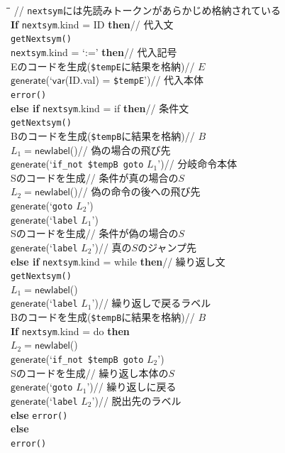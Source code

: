 \documentclass[dvipdfmx]{jarticle}
\begin{document}
\begin{tabbing}
\qquad\=\qquad\=\qquad\qquad\qquad\qquad\qquad\qquad\qquad\qquad\qquad\= \kill
// \verb|nextsym|には先読みトークンがあらかじめ格納されている\\
{\rm\bf If} \verb|nextsym|.kind = {\sf ID} {\rm\bf then}\>\>\>// 代入文\\
\> \verb|getNextsym()|\\
 \verb|nextsym|.kind = `{\sf :=}' {\rm\bf then}\>\>// 代入記号\\
\>\> Eのコードを生成(\verb|$tempE|に結果を格納)\>// $E$\\
\>\> $\mathsf{generate}$(`$\mathsf{var}$({\sf ID}.val) = \verb|$tempE|')\>// 代入本体\\
 \verb|error()|\\
{\rm\bf else if} \verb|nextsym|.kind = {\sf if} {\rm\bf then}\>\>\>// 条件文\\
\> \verb|getNextsym()|\\
\> Bのコードを生成(\verb|$tempB|に結果を格納)\>\>// $B$\\
\> $L_1=\mathsf{newlabel}$()\>\>// 偽の場合の飛び先\\
\> $\mathsf{generate}$(`\verb|if_not|\ \verb|$tempB|\ \verb|goto| $L_1$')\>\>// 分岐命令本体\\
\> Sのコードを生成\>\>// 条件が真の場合の$S$\\
\> $L_2=\mathsf{newlabel}$()\>\>// 偽の命令の後への飛び先\\
\> $\mathsf{generate}$(`\verb|goto| $L_2$')\\
\> $\mathsf{generate}$(`\verb|label| $L_1$')\\
\> Sのコードを生成\>\>// 条件が偽の場合の$S$\\
\> $\mathsf{generate}$(`\verb|label| $L_2$')\>\>// 真の$S$のジャンプ先\\
{\rm\bf else if} \verb|nextsym|.kind = {\sf while} {\rm\bf then}\>\>\>// 繰り返し文\\
\> \verb|getNextsym()|\\
\> $L_1=\mathsf{newlabel}$()\\
\> $\mathsf{generate}$(`\verb|label| $L_1$')\>\>// 繰り返しで戻るラベル\\
\> Bのコードを生成(\verb|$tempB|に結果を格納)\>\>// $B$\\
\> {\rm\bf If} \verb|nextsym|.kind = {\sf do} {\rm\bf then}\\
\>\> $L_2=\mathsf{newlabel}$()\\
\>\> $\mathsf{generate}$(`\verb|if_not|\ \verb|$tempB|\ \verb|goto| $L_2$')\\
\>\> Sのコードを生成\>// 繰り返し本体の$S$\\
\>\> $\mathsf{generate}$(`\verb|goto| $L_1$')\>// 繰り返しに戻る\\
\>\> $\mathsf{generate}$(`\verb|label| $L_2$')\>// 脱出先のラベル\\
\> {\rm\bf else} \verb|error()|\\
{\rm\bf else}\\
\>\verb|error()|
\end{tabbing}
\end{document}
